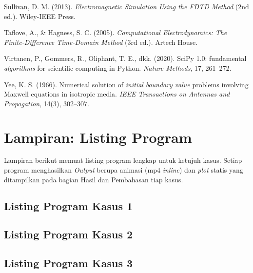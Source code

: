 \documentclass[11pt,a4paper]{article}
\begin{document}
\hangindent=0.7cm Sullivan, D. M. (2013). \textit{Electromagnetic Simulation Using the FDTD Method} (2nd ed.). Wiley-IEEE Press.\par
\hangindent=0.7cm Taflove, A., \& Hagness, S. C. (2005). \textit{Computational Electrodynamics: The Finite-Difference Time-Domain Method} (3rd ed.). Artech House.\par
\hangindent=0.7cm Virtanen, P., Gommers, R., Oliphant, T. E., dkk. (2020). SciPy 1.0: fundamental \textit{algorithms} for scientific computing in Python. \textit{Nature Methods}, 17, 261--272.\par
\hangindent=0.7cm Yee, K. S. (1966). Numerical solution of \textit{initial} \textit{boundary} \textit{value} problems involving Maxwell equations in isotropic media. \textit{IEEE Transactions on Antennas and Propagation}, 14(3), 302--307.\par
\endgroup

\section*{Lampiran: Listing Program}

Lampiran berikut memuat listing program lengkap untuk ketujuh kasus. Setiap program menghasilkan \textit{Output} berupa animasi (mp4 \textit{inline}) dan \textit{plot} statis yang ditampilkan pada bagian Hasil dan Pembahasan tiap kasus.

\subsection*{Listing Program Kasus 1}


\subsection*{Listing Program Kasus 2}


\subsection*{Listing Program Kasus 3}

\end{document}
